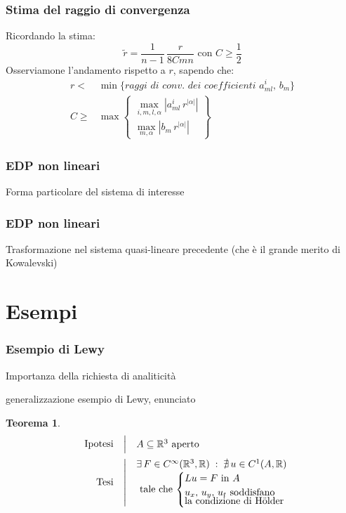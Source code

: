 \documentclass[serif,notheorems]{beamer}
\makeatletter
\newenvironment{ipotesi}%
{\quad\left|\quad\def\arraystretch{1.2}\begin{array}{@{}l@{}}}%
{\end{array}\right.}
\newcommand{\hpth}[2]
{
\begin{align*}
\quad
\text{Ipotesi}
&\begin{ipotesi}
#1
\end{ipotesi}\\
\text{Tesi}
&\begin{ipotesi}
#2
\end{ipotesi}
\end{align*}
}
\theoremstyle{definition} %
\newtheorem{theorem}{Teorema}[section] %
\theoremstyle{remark}
\newenvironment{system}%
{\left\lbrace\begin{array}{@{}l@{}}}%
{\end{array}\right.}
\makeatother
\begin{document}
\begin{frame}
\frametitle{Stima del raggio di convergenza}
Ricordando la stima:
$$\widetilde{r} = \dfrac{1}{n-1}\, \dfrac{r}{8Cmn} \text{ con } C \geq \frac{1}{2}$$
Osserviamone l'andamento rispetto a $r$, sapendo che:
\begin{align*}
r <& \min \{ \textit{raggi di conv. dei coefficienti } a^i_{ml}, \, b_m\} \\
C \geq & \max \begin{Bmatrix}
\max\limits_{i,m,l,\alpha } \left|a^i_{ml} \, r^{|\alpha |}\right|\\
\max\limits_{m,\alpha} \left|b_m \, r^{|\alpha |}\right|
\end{Bmatrix}
\end{align*}
\end{frame}

\begin{frame}
\frametitle{EDP non lineari}
Forma particolare del sistema di interesse
\end{frame}

\begin{frame}
\frametitle{EDP non lineari}
Trasformazione nel sistema quasi-lineare precedente (che è il grande merito di Kowalevski)
\end{frame}




\section{Esempi}

\begin{frame}
\frametitle{Esempio di Lewy}
Importanza della richiesta di analiticità
\end{frame}

\begin{frame}
generalizzazione esempio di Lewy, enunciato
\begin{theorem}
\hpth{
A \subseteq \mathbb{R}^3 \text{ aperto }\\
}
{
\exists \, F \in C^{\infty}(\mathbb{R}^3,\mathbb{R}) \; : \; \nexists \, u \in C^1(A,\mathbb{R}) \\ \text{ tale che }
\begin{system}
Lu=F \text{ in } A\\
\vspace{-2mm}
u_x,\,u_y,\,u_t \text{ soddisfano} \\
\text {la condizione di Hölder }
\end{system}
}
\end{theorem}
\end{frame}
\end{document}

